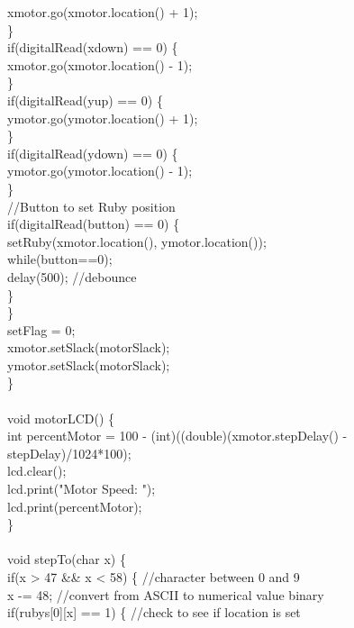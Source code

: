 \tabto*{1.5cm} xmotor.go(xmotor.location() + 1);\\
\tabto*{1cm}\}\\
\tabto*{1cm} if(digitalRead(xdown) == 0) \{\\
\tabto*{1.5cm} xmotor.go(xmotor.location() - 1);\\
\tabto*{1cm}\}\\
\tabto*{1cm}if(digitalRead(yup) == 0) \{\\
\tabto*{1.5cm} ymotor.go(ymotor.location() + 1);\\
\tabto*{1cm}\}\\
\tabto*{1cm} if(digitalRead(ydown) == 0) \{\\
\tabto*{1.5cm} ymotor.go(ymotor.location() - 1);\\
\tabto*{1cm}\}\\
\tabto*{1cm}//Button to set Ruby position\\
\tabto*{1cm} if(digitalRead(button) == 0) \{\\
\tabto*{1.5cm}setRuby(xmotor.location(), ymotor.location());\\
\tabto*{1.5cm} while(button==0);\\
\tabto*{1.5cm} delay(500);\tabto*{7.5cm}  //debounce\\
\tabto*{1cm}\}\\
\tabto*{.5cm}\}\\
\tabto*{.5cm} setFlag = 0;\\
\tabto*{.5cm} xmotor.setSlack(motorSlack);\\
\tabto*{.5cm} ymotor.setSlack(motorSlack);\\
\}\\
\\
void motorLCD() \{\\
\tabto*{.5cm} int percentMotor = 100 - (int)((double)(xmotor.stepDelay() - stepDelay)/1024*100);\\
\tabto*{.5cm} lcd.clear();\\
\tabto*{.5cm} lcd.print("Motor Speed: ");\\
\tabto*{.5cm} lcd.print(percentMotor); \\ 
\}\\
\\
void stepTo(char x) \{\\
\tabto*{.5cm} if(x > 47 \&\& x < 58) \{\tabto*{7.5cm}  //character between 0 and 9\\
\tabto*{1cm} x -= 48;\tabto*{7.5cm}  //convert from ASCII to numerical value binary\\
\tabto*{1cm} if(rubys[0][x] == 1) \{\tabto*{7.5cm}  //check to see if location is set\\
